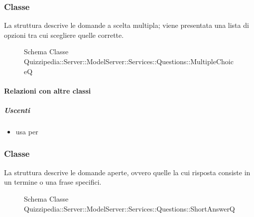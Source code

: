 \subsubsection{Classe }
La struttura descrive le domande a scelta multipla; viene presentata una lista di opzioni tra cui scegliere quelle corrette.
\begin{figure}[H]
\centering
\noindent{}
\caption[Schema Classe MultipleChoiceQ]{Schema Classe Quizzipedia::Server::ModelServer::Services::Questions::MultipleChoiceQ}
\end{figure}
\paragraph{Relazioni con altre classi}
\subparagraph{Uscenti}
\begin{itemize}
\item usa  per 
\end{itemize}
\subsubsection{Classe }
La struttura descrive le domande aperte, ovvero quelle la cui risposta consiste in un termine o una frase specifici.
\begin{figure}[H]
\centering
\noindent{}
\caption[Schema Classe ShortAnswerQ]{Schema Classe Quizzipedia::Server::ModelServer::Services::Questions::ShortAnswerQ}
\end{figure}
